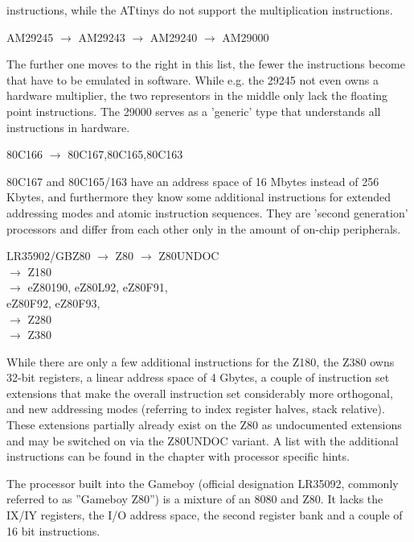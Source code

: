 \documentclass[12pt,twoside]{report}
\begin{document}
instructions, while the ATtinys do not support the multiplication
instructions.
\begin{cpulist}
   AM29245 $\rightarrow$ AM29243 $\rightarrow$ AM29240 $\rightarrow$ AM29000
\end{cpulist}
The further one moves to the right in this list, the fewer the
instructions become that have to be emulated in software.  While e.g.
the 29245 not even owns a hardware multiplier, the two representors in
the middle only lack the floating point instructions.  The 29000
serves as a 'generic' type that understands all instructions in
hardware.
\begin{cpulist}
   80C166 $\rightarrow$ 80C167,80C165,80C163
\end{cpulist}
80C167 and 80C165/163 have an address space of 16 Mbytes instead of 256
Kbytes, and furthermore they know some additional instructions for
extended addressing modes and atomic instruction sequences.  They are
'second generation' processors and differ from each other only in the
amount of on-chip peripherals.
\begin{cpulist}
   LR35902/GBZ80 $\rightarrow$ Z80 $\rightarrow$ Z80UNDOC \\
\> $\rightarrow$ Z180 \\
\> $\rightarrow$ eZ80190, eZ80L92, eZ80F91, \\
\> eZ80F92, eZ80F93, \\
\> $\rightarrow$ Z280 \\
\> $\rightarrow$ Z380
\end{cpulist}
While there are only a few additional instructions for the Z180, the
Z380 owns 32-bit registers, a linear address space of 4 Gbytes, a
couple of instruction set extensions that make the overall
instruction set considerably more orthogonal, and new addressing
modes (referring to index register halves, stack relative).  These
extensions partially already exist on the Z80 as undocumented
extensions and may be switched on via the Z80UNDOC variant.  A list
with the additional instructions can be found in the chapter
with processor specific hints.

The processor built into the Gameboy (official designation LR35092,
commonly referred to as ''Gameboy Z80'') is a mixture of an 8080
and Z80.  It lacks the IX/IY registers, the I/O address space,
the second register bank and a couple of 16 bit instructions.
\end{document}
